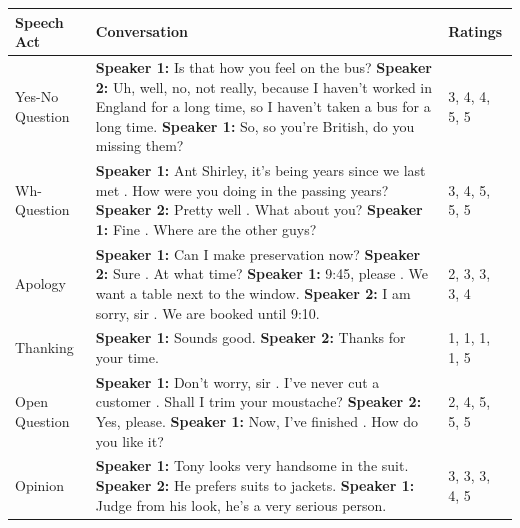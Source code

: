 \documentclass[11pt]{article}
\begin{document}
\begin{table}
\center
\small
\begin{tabular}{|p{2.5cm}|p{7cm}|p{2.5cm}|}
\hline \textbf{Speech Act} & \textbf{Conversation} & \textbf{Ratings} \\\hline
Yes-No Question & \textbf{Speaker 1:} Is that how you feel on the bus? \newline \hspace*{0.5cm} \textbf{Speaker 2:} Uh, well, no, not really, because I haven't worked in England for a long time, so I haven't taken a bus for a long time. \newline \textbf{Speaker 1:} So, so you're British, do you missing them? & 3, 4, 4, 5, 5 \\\hline
Wh-Question & \textbf{Speaker 1:} Ant Shirley, it's being years since we last met . How were you doing in the passing years? \newline \hspace*{0.5cm} \textbf{Speaker 2:} Pretty well . What about you? \newline \textbf{Speaker 1:} Fine . Where are the other guys? & 3, 4, 5, 5, 5 \\\hline
Apology & \textbf{Speaker 1:} Can I make preservation now? \newline \hspace*{0.5cm} \textbf{Speaker 2:} Sure . At what time? \newline \textbf{Speaker 1:} 9:45, please . We want a table next to the window. \newline \hspace*{0.5cm} \textbf{Speaker 2:} I am sorry, sir . We are booked until 9:10. & 2, 3, 3, 3, 4 \\\hline
Thanking & \textbf{Speaker 1:} Sounds good. \newline \hspace*{0.5cm} \textbf{Speaker 2:} Thanks for your time. & 1, 1, 1, 1, 5 \\\hline\hline
Open Question & \textbf{Speaker 1:} Don't worry, sir . I've never cut a customer . Shall I trim your moustache? \newline \hspace*{0.5cm} \textbf{Speaker 2:} Yes, please. \newline \textbf{Speaker 1:} Now, I've finished . How do you like it? & 2, 4, 5, 5, 5 \\\hline
Opinion & \textbf{Speaker 1:} Tony looks very handsome in the suit.\newline \hspace*{0.5cm} \textbf{Speaker 2:} He prefers suits to jackets. \newline \textbf{Speaker 1:} Judge from his look, he's a very serious person. & 3, 3, 3, 4, 5 \\\hline

\end{tabular}
\end{table}
\end{document}
